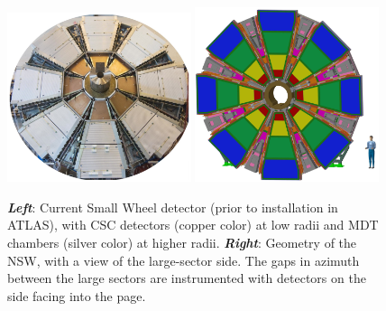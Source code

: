 \begin{figure}[!htb]
    \begin{center}
        \includegraphics[width=0.48\textwidth]{figures/nsw/nsw_current_sw}
        \includegraphics[width=0.48\textwidth]{figures/nsw/nsw_cartoon}
        \caption{
            \textbf{\textit{Left}}: Current Small Wheel detector (prior to installation in ATLAS), with CSC detectors (copper color) at low radii
                and MDT chambers (silver color) at higher radii.
            \textbf{\textit{Right}}: Geometry of the NSW, with a view of the large-sector side. The gaps in azimuth
                between the large sectors are instrumented with detectors on the side facing into the page.
        }
        \label{fig:nsw_geo}
    \end{center}
\end{figure}

